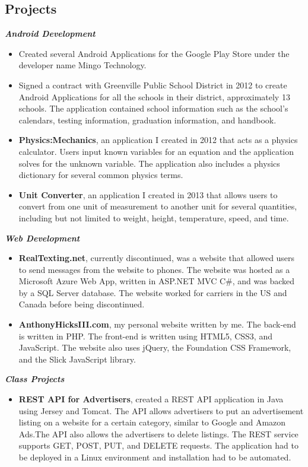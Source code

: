 \documentclass[10pt]{res}
\begin{document}
\begin{resume}
\section{Projects}
\textbf{\textit{Android Development}}
	\vspace*{.25em}
	\begin{itemize}
		\item Created several Android Applications for the Google Play Store under the developer name Mingo Technology.
		\item Signed a contract with Greenville Public School District in 2012 to create Android Applications for all the schools in their district, approximately 13 schools. The application contained school information such as the school's calendars, testing information, graduation information, and handbook.
		\item \textbf{Physics:Mechanics}, an application I created in 2012 that acts as a physics calculator. Users input known variables for an equation and the application solves for the unknown variable. The application also includes a physics dictionary for several common physics terms. 
		\item \textbf{Unit Converter}, an application I created in 2013 that allows users to convert from one unit of measurement to another unit for several quantities, including but not limited to weight, height, temperature, speed, and time. 
	\end{itemize} 
\textbf{\textit{Web Development}}
	\vspace*{.25em}
	\begin{itemize}
		\item \textbf{RealTexting.net}, currently discontinued, was a website that allowed users to send messages from the website to phones. The website was hosted as a Microsoft Azure Web App, written in ASP.NET MVC C\#, and was backed by a SQL Server database. The website worked for carriers in the US and Canada before being discontinued. 
		\item \textbf{AnthonyHicksIII.com}, my personal website written by me. The back-end is written in PHP. The front-end is written using HTML5, CSS3, and JavaScript. The website also uses jQuery, the Foundation CSS Framework, and the Slick JavaScript library.
	\end{itemize}
\textbf{\textit{Class Projects}}
	\vspace*{.25em}
	\begin{itemize}
		\item \textbf{REST API for Advertisers}, created a REST API application in Java using Jersey and Tomcat. The API allows advertisers to put an advertisement listing on a website for a certain category, similar to Google and Amazon Ads.The API also allows the advertisers to delete listings. The REST service supports GET, POST, PUT, and DELETE requests. The application had to be deployed in a Linux environment and installation had to be automated. 
	\end{itemize} 


\end{resume}
\end{document}
